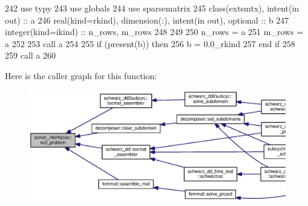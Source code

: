 \begin{DoxyCode}
242       \textcolor{keywordtype}{use }typy
243       \textcolor{keywordtype}{use }globals
244       \textcolor{keywordtype}{use }sparsematrix
245       \textcolor{keywordtype}{class}(extsmtx), \textcolor{keywordtype}{intent(in out)} :: a
246       \textcolor{keywordtype}{real(kind=rkind)}, \textcolor{keywordtype}{dimension(:)}, \textcolor{keywordtype}{intent(in out)}, \textcolor{keywordtype}{optional} :: b
247       \textcolor{keywordtype}{integer(kind=ikind)} :: n\_rows, m\_rows
248 
249       
250       n\_rows = a%
251       m\_rows = a%
252    
253       \textcolor{keyword}{call }a%
254       
255       \textcolor{keywordflow}{if} (\textcolor{keyword}{present}(b)) \textcolor{keywordflow}{then}
256         b = 0.0\_rkind
257 \textcolor{keywordflow}{      end if}
258       
259       \textcolor{keyword}{call }a%
260       
\end{DoxyCode}


Here is the caller graph for this function\+:\nopagebreak
\begin{figure}[H]
\begin{center}
\leavevmode
\includegraphics[width=350pt]{namespacesolver__interfaces_abd70a6e039e5f2f62c473d9afbe90cc2_icgraph}
\end{center}
\end{figure}


